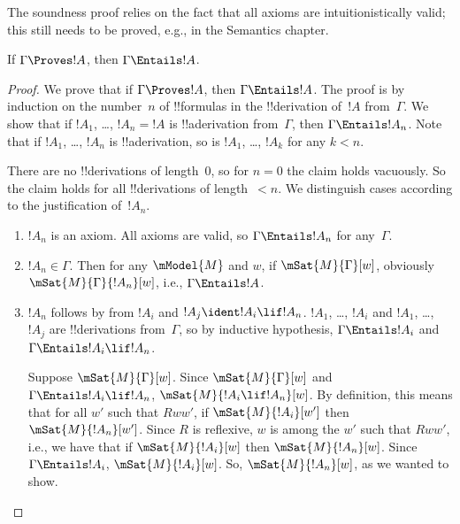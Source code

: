 \documentclass[../../../include/open-logic-section]{subfiles}
\begin{document}

\begin{editorial}
  The soundness proof relies on the fact that all axioms are
  intuitionistically valid; this still needs to be proved, e.g., in
  the Semantics chapter.
\end{editorial}

\begin{thm}[Soundness]
  If $\Gamma \Proves !A$, then $ \Gamma \Entails !A$.
\end{thm}

\begin{proof}
  We prove that if $\Gamma \Proves !A$, then $\Gamma \Entails !A$.
  The proof is by induction on the number~$n$ of !!{formula}s in the
  !!{derivation} of~$!A$ from~$\Gamma$.  We show that if $!A_1$,
  \dots, $!A_n = !A$ is !!a{derivation} from~$\Gamma$, then $\Gamma
  \Entails !A_n$. Note that if $!A_1$, \dots, $!A_n$ is
  !!a{derivation}, so is $!A_1$, \dots, $!A_k$ for any $k<n$.

  There are no !!{derivation}s of length~$0$, so for $n=0$ the claim
  holds vacuously. So the claim holds for all !!{derivation}s of
  length~$<n$. We distinguish cases according to the justification
  of~$!A_n$.
  
  \begin{enumerate}
  \item $!A_n$ is an axiom. All axioms are valid, so $\Gamma \Entails
    !A_n$ for any~$\Gamma$.
  \item $!A_n \in \Gamma$. Then for any $\mModel{M}$ and $w$, if
    $\mSat{M}{\Gamma}[w]$, obviously $\mSat{M}{\Gamma}{!A_n}[w]$,
    i.e., $\Gamma \Entails !A$.
  \item $!A_n$ follows by \MP{} from $!A_i$ and $!A_j \ident !A_i \lif
    !A_n$. $!A_1$, \dots, $!A_i$ and $!A_1$, \dots, $!A_j$ are
    !!{derivation}s from~$\Gamma$, so by inductive hypothesis, $\Gamma
    \Entails !A_i$ and $\Gamma \Entails !A_i \lif !A_n$.
    
    Suppose $\mSat{M}{\Gamma}[w]$. Since $\mSat{M}{\Gamma}[w]$ and
    $\Gamma \Entails !A_i \lif !A_n$, $\mSat{M}{!A_i \lif
      !A_n}[w]$. By definition, this means that for all $w'$ such that
    $Rww'$, if $\mSat{M}{!A_i}[w']$ then $\mSat{M}{!A_n}[w']$. Since
    $R$ is reflexive, $w$ is among the $w'$ such that $Rww'$, i.e., we
    have that if $\mSat{M}{!A_i}[w]$ then $\mSat{M}{!A_n}[w]$. Since
    $\Gamma \Entails !A_i$, $\mSat{M}{!A_i}[w]$. So,
    $\mSat{M}{!A_n}[w]$, as we wanted to show.
  \end{enumerate}
\end{proof}
\end{document}
